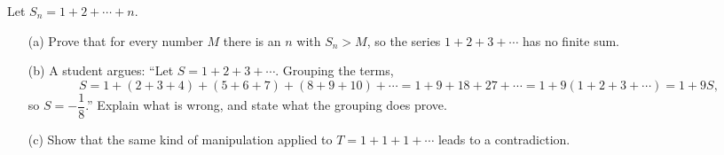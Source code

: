 Let $S_n=1+2+\cdots+n$.
\begin{enumerate}
\item[(a)] Prove that for every number $M$ there is an $n$ with $S_n>M$, so the series $1+2+3+\cdots$ has no finite sum.
\item[(b)] A student argues: ``Let $S=1+2+3+\cdots$. Grouping the terms,
\[S=1+(2+3+4)+(5+6+7)+(8+9+10)+\cdots=1+9+18+27+\cdots=1+9(1+2+3+\cdots)=1+9S,\]
so $S=-\dfrac18$.'' Explain what is wrong, and state what the grouping does prove.
\item[(c)] Show that the same kind of manipulation applied to $T=1+1+1+\cdots$ leads to a contradiction.
\end{enumerate}
